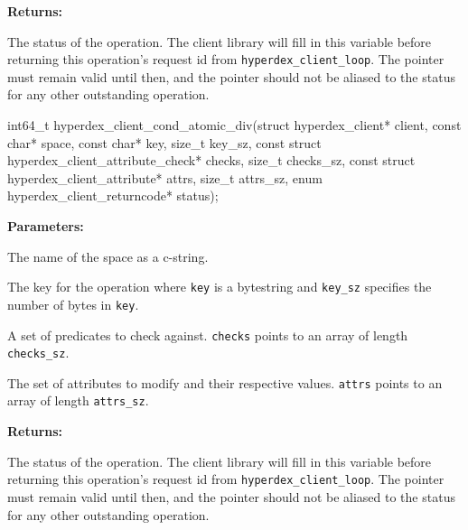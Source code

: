\noindent\textbf{Returns:}
\begin{description}[labelindent=\widthof{{\texttt{status}}},leftmargin=*,noitemsep,nolistsep,align=right]
\item[\texttt{status}] The status of the operation.  The client library will fill in this variable before returning this operation's request id from \texttt{hyperdex\_client\_loop}.  The pointer must remain valid until then, and the pointer should not be aliased to the status for any other outstanding operation.
\end{description}

\funcsep
{}
\begin{ccode}
int64_t hyperdex_client_cond_atomic_div(struct hyperdex_client* client,
                const char* space,
                const char* key, size_t key_sz,
                const struct hyperdex_client_attribute_check* checks, size_t checks_sz,
                const struct hyperdex_client_attribute* attrs, size_t attrs_sz,
                enum hyperdex_client_returncode* status);
\end{ccode}
\funcdesc 

\noindent\textbf{Parameters:}
\begin{description}[labelindent=\widthof{{\texttt{checks}, \texttt{checks\_sz}}},leftmargin=*,noitemsep,nolistsep,align=right]
\item[\texttt{space}] The name of the space as a c-string.
\item[\texttt{key}, \texttt{key\_sz}] The key for the operation where \texttt{key} is a bytestring and \texttt{key\_sz} specifies the number of bytes in \texttt{key}.
\item[\texttt{checks}, \texttt{checks\_sz}] A set of predicates to check against.  \texttt{checks} points to an array of length \texttt{checks\_sz}.
\item[\texttt{attrs}, \texttt{attrs\_sz}] The set of attributes to modify and their respective values.  \texttt{attrs} points to an array of length \texttt{attrs\_sz}.
\end{description}

\noindent\textbf{Returns:}
\begin{description}[labelindent=\widthof{{\texttt{status}}},leftmargin=*,noitemsep,nolistsep,align=right]
\item[\texttt{status}] The status of the operation.  The client library will fill in this variable before returning this operation's request id from \texttt{hyperdex\_client\_loop}.  The pointer must remain valid until then, and the pointer should not be aliased to the status for any other outstanding operation.
\end{description}

